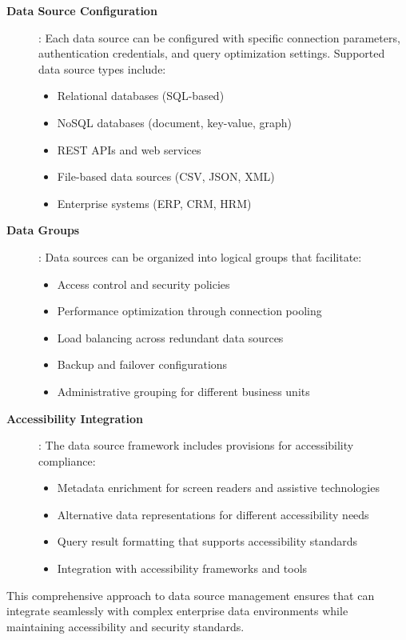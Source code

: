 \begin{description}
\item[\textbf{Data Source Configuration}]: Each data source can be configured with specific connection parameters, authentication credentials, and query optimization settings. Supported data source types include:
\begin{itemize}
\item Relational databases (SQL-based)
\item NoSQL databases (document, key-value, graph)
\item REST APIs and web services
\item File-based data sources (CSV, JSON, XML)
\item Enterprise systems (ERP, CRM, HRM)
\end{itemize}

\item[\textbf{Data Groups}]: Data sources can be organized into logical groups that facilitate:
\begin{itemize}
\item Access control and security policies
\item Performance optimization through connection pooling
\item Load balancing across redundant data sources
\item Backup and failover configurations
\item Administrative grouping for different business units
\end{itemize}

\item[\textbf{Accessibility Integration}]: The data source framework includes provisions for accessibility compliance:
\begin{itemize}
\item Metadata enrichment for screen readers and assistive technologies
\item Alternative data representations for different accessibility needs
\item Query result formatting that supports accessibility standards
\item Integration with accessibility frameworks and tools
\end{itemize}
\end{description}

This comprehensive approach to data source management ensures that \wbdl{} can integrate seamlessly with complex enterprise data environments while maintaining accessibility and security standards.

